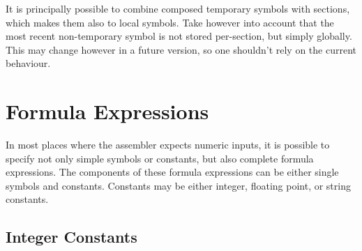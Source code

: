 \documentclass[12pt,twoside]{report}
\begin{document}
It is principally possible to combine composed temporary symbols with
sections, which makes them also to local symbols.  Take however into
account that the most recent non-temporary symbol is not stored
per-section, but simply globally.  This may change however in a future
version, so one shouldn't rely on the current behaviour.


\section{Formula Expressions}

In most places where the assembler expects numeric inputs, it is
possible to specify not only simple symbols or constants, but also
complete formula expressions.  The components of these formula
expressions can be either single symbols and constants.  Constants may be
either integer, floating point, or string constants.

\subsection{Integer Constants}
\label{SectIntConsts}
\end{document}
